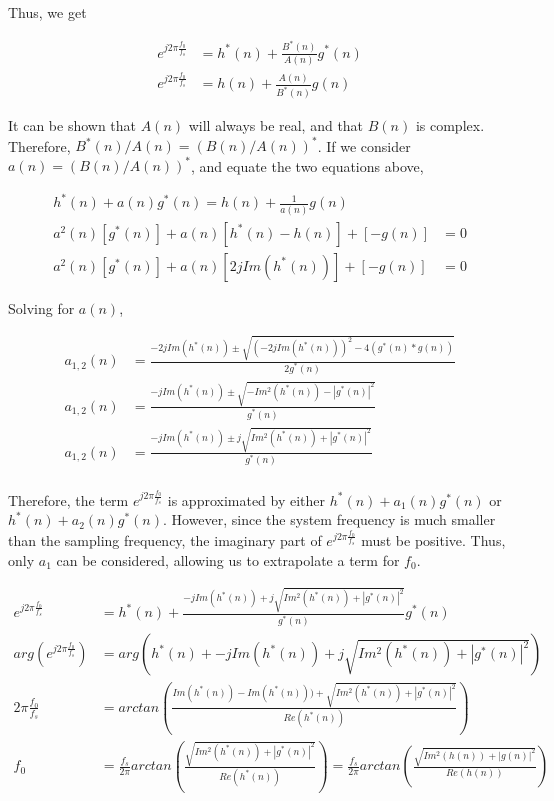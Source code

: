 \documentclass[main.tex]{subfiles}
\begin{document}
Thus, we get

\begin{align*}
e^{j2\pi\frac{f_0}{f_s}} &= h^*(n) + \frac{B^*(n)}{A(n)}g^*(n)\\
e^{j2\pi\frac{f_0}{f_s}} &= h(n) + \frac{A(n)}{B^*(n)}g(n)
\end{align*}

It can be shown that $A(n)$ will always be real, and that $B(n)$ is complex. Therefore, $B^*(n)/A(n) = \left(B(n)/A(n)\right)^*$. If we consider $a(n) = (B(n)/A(n))^*$, and equate the two equations above,

\begin{align*}
h^*(n) + a(n)g^*(n) = h(n) + \frac{1}{a(n)}g(n)\\
a^2(n)\left[g^*(n)\right] + a(n)\left[h^*(n) - h(n)\right] + \left[-g(n)\right] &= 0\\
a^2(n)\left[g^*(n)\right] + a(n)\left[2jIm(h^*(n))\right] + \left[-g(n)\right] &= 0
\end{align*}

Solving for $a(n)$,

\begin{align*}
a_{1,2}(n) &= \frac{-2jIm(h^*(n)) \pm \sqrt{ (-2jIm(h^*(n)))^2 -4(g^*(n) * g(n)) } }{2g^*(n)}\\
a_{1,2}(n) &= \frac{-jIm(h^*(n)) \pm \sqrt{ -Im^2(h^*(n)) -|g^*(n)|^2 } }{g^*(n)}\\
a_{1,2}(n) &= \frac{-jIm(h^*(n)) \pm j\sqrt{ Im^2(h^*(n)) + |g^*(n)|^2 } }{g^*(n)}\\
\end{align*}

Therefore, the term $e^{j2\pi\frac{f_0}{f_s}}$ is approximated by either $h^*(n) + a_1(n)g^*(n)$ or $h^*(n) + a_2(n)g^*(n)$. However, since the system frequency is much smaller than the sampling frequency, the imaginary part of $e^{j2\pi\frac{f_0}{f_s}}$ must be positive. Thus, only $a_1$ can be considered, allowing us to extrapolate a term for $f_0$.

\begin{align*}
e^{j2\pi\frac{f_0}{f_s}} &= h^*(n) + \frac{-jIm(h^*(n)) + j\sqrt{ Im^2(h^*(n)) + |g^*(n)|^2 } }{g^*(n)}g^*(n)\\
arg(e^{j2\pi\frac{f_0}{f_s}}) &= arg\left(h^*(n) + -jIm(h^*(n)) + j\sqrt{ Im^2(h^*(n)) + |g^*(n)|^2 } \right)\\
2\pi\frac{f_0}{f_s} &= arctan(\frac{Im(h^*(n)) - Im(h^*(n)))+\sqrt{ Im^2(h^*(n)) + |g^*(n)|^2 }}{Re(h^*(n))})\\
f_0 &= \frac{f_s}{2\pi}arctan(\frac{\sqrt{ Im^2(h^*(n)) + |g^*(n)|^2 }}{Re(h^*(n))}) = \frac{f_s}{2\pi}arctan(\frac{\sqrt{ Im^2(h(n)) + |g(n)|^2 }}{Re(h(n))})
\end{align*}
\end{document}
